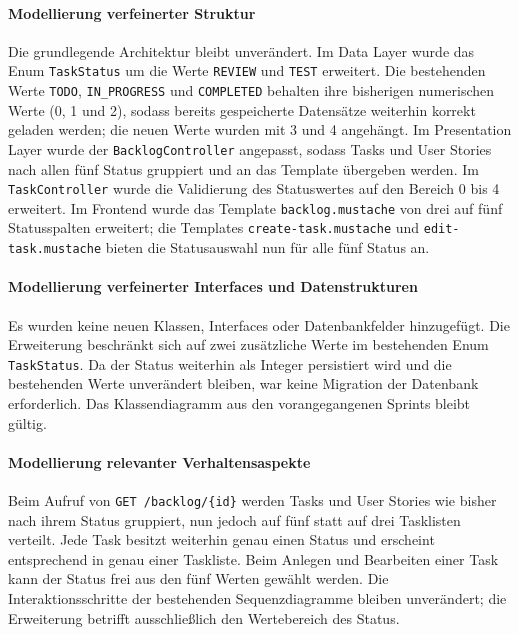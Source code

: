 \documentclass[a4paper,11pt]{article}
\begin{document}
\paragraph{Modellierung verfeinerter Struktur}
Die grundlegende Architektur bleibt unverändert. Im Data Layer wurde das Enum \texttt{TaskStatus} um die Werte \texttt{REVIEW} und \texttt{TEST} erweitert. Die bestehenden Werte \texttt{TODO}, \texttt{IN\_PROGRESS} und \texttt{COMPLETED} behalten ihre bisherigen numerischen Werte (0, 1 und 2), sodass bereits gespeicherte Datensätze weiterhin korrekt geladen werden; die neuen Werte wurden mit 3 und 4 angehängt. Im Presentation Layer wurde der \texttt{BacklogController} angepasst, sodass Tasks und User Stories nach allen fünf Status gruppiert und an das Template übergeben werden. Im \texttt{TaskController} wurde die Validierung des Statuswertes auf den Bereich 0 bis 4 erweitert. Im Frontend wurde das Template \texttt{backlog.mustache} von drei auf fünf Statusspalten erweitert; die Templates \texttt{create-task.mustache} und \texttt{edit-task.mustache} bieten die Statusauswahl nun für alle fünf Status an.

\paragraph{Modellierung verfeinerter Interfaces und Datenstrukturen}
Es wurden keine neuen Klassen, Interfaces oder Datenbankfelder hinzugefügt. Die Erweiterung beschränkt sich auf zwei zusätzliche Werte im bestehenden Enum \texttt{TaskStatus}. Da der Status weiterhin als Integer persistiert wird und die bestehenden Werte unverändert bleiben, war keine Migration der Datenbank erforderlich. Das Klassendiagramm aus den vorangegangenen Sprints bleibt gültig.

\paragraph{Modellierung relevanter Verhaltensaspekte}
Beim Aufruf von \texttt{GET /backlog/\{id\}} werden Tasks und User Stories wie bisher nach ihrem Status gruppiert, nun jedoch auf fünf statt auf drei Tasklisten verteilt. Jede Task besitzt weiterhin genau einen Status und erscheint entsprechend in genau einer Taskliste. Beim Anlegen und Bearbeiten einer Task kann der Status frei aus den fünf Werten gewählt werden. Die Interaktionsschritte der bestehenden Sequenzdiagramme bleiben unverändert; die Erweiterung betrifft ausschließlich den Wertebereich des Status.
\end{document}
